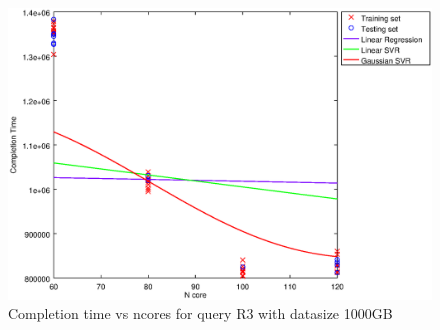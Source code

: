 
\begin {figure}[hbtp]
\centering
\includegraphics[width=\textwidth]{output/R3_1000_LINEAR_NCORE/plot_R3_1000_bestmodels.eps}
\caption{Completion time vs ncores for query R3 with datasize 1000GB}
\label{fig:coreonly_linear_R3_1000}
\end {figure}
